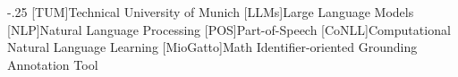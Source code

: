 \documentclass[headsepline,footsepline,footinclude=false,oneside,fontsize=11pt,paper=a4,listof=totoc,bibliography=totoc]{scrbook} %
\begin{document}


\frontmatter{}





\tableofcontents{}

\mainmatter{}



\appendix{}


\begin{acronym}
	\itemsep-.25\baselineskip
	[TUM]{Technical University of Munich}
	[LLMs]{Large Language Models}
	[NLP]{Natural Language Processing}
	[POS]{Part-of-Speech}
	[CoNLL]{Computational Natural Language Learning}
	[MioGatto]{Math Identifier-oriented Grounding Annotation Tool}
\end{acronym}

\listoffigures{}
\listoftables{}
\printbibliography{}
\end{document}
